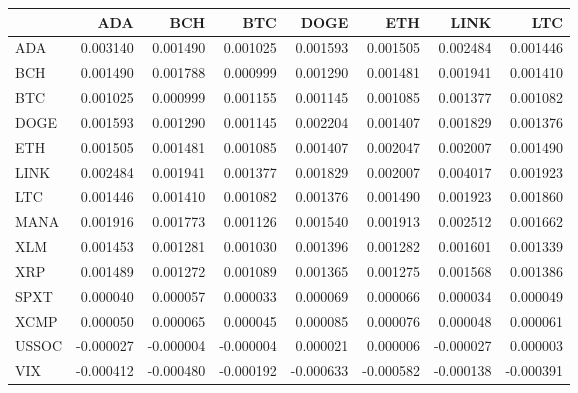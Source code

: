 \begin{tabular}{lrrrrrrr}
\toprule
 & ADA & BCH & BTC & DOGE & ETH & LINK & LTC \\
\midrule
ADA & 0.003140 & 0.001490 & 0.001025 & 0.001593 & 0.001505 & 0.002484 & 0.001446 \\
BCH & 0.001490 & 0.001788 & 0.000999 & 0.001290 & 0.001481 & 0.001941 & 0.001410 \\
BTC & 0.001025 & 0.000999 & 0.001155 & 0.001145 & 0.001085 & 0.001377 & 0.001082 \\
DOGE & 0.001593 & 0.001290 & 0.001145 & 0.002204 & 0.001407 & 0.001829 & 0.001376 \\
ETH & 0.001505 & 0.001481 & 0.001085 & 0.001407 & 0.002047 & 0.002007 & 0.001490 \\
LINK & 0.002484 & 0.001941 & 0.001377 & 0.001829 & 0.002007 & 0.004017 & 0.001923 \\
LTC & 0.001446 & 0.001410 & 0.001082 & 0.001376 & 0.001490 & 0.001923 & 0.001860 \\
MANA & 0.001916 & 0.001773 & 0.001126 & 0.001540 & 0.001913 & 0.002512 & 0.001662 \\
XLM & 0.001453 & 0.001281 & 0.001030 & 0.001396 & 0.001282 & 0.001601 & 0.001339 \\
XRP & 0.001489 & 0.001272 & 0.001089 & 0.001365 & 0.001275 & 0.001568 & 0.001386 \\
SPXT & 0.000040 & 0.000057 & 0.000033 & 0.000069 & 0.000066 & 0.000034 & 0.000049 \\
XCMP & 0.000050 & 0.000065 & 0.000045 & 0.000085 & 0.000076 & 0.000048 & 0.000061 \\
USSOC & -0.000027 & -0.000004 & -0.000004 & 0.000021 & 0.000006 & -0.000027 & 0.000003 \\
VIX & -0.000412 & -0.000480 & -0.000192 & -0.000633 & -0.000582 & -0.000138 & -0.000391 \\
\bottomrule
\end{tabular}
